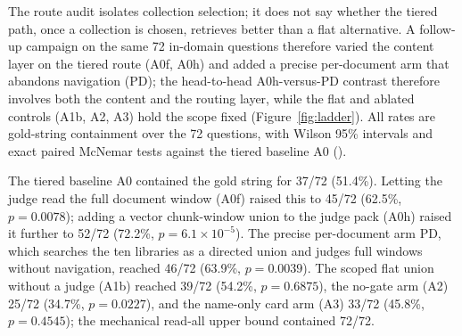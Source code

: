 The route audit isolates collection selection; it does not say whether the
tiered path, once a collection is chosen, retrieves better than a flat
alternative. A follow-up campaign on the same 72 in-domain questions therefore
varied the content layer on the tiered route (A0f, A0h) and added a precise
per-document arm that abandons navigation (PD); the head-to-head
A0h-versus-PD contrast therefore involves both the content and the routing
layer, while the flat and ablated controls (A1b, A2, A3) hold the scope fixed
(Figure~\ref{fig:ladder}). All rates
are gold-string containment over the 72 questions, with Wilson 95\% intervals
and exact paired McNemar tests against the tiered baseline A0
().

The tiered baseline A0 contained the gold string for 37/72 (51.4\%). Letting
the judge read the full document window (A0f) raised this to 45/72 (62.5\%,
$p=0.0078$); adding a vector chunk-window union to the judge pack (A0h)
raised it further to 52/72 (72.2\%, $p=6.1\times10^{-5}$). The precise
per-document arm PD, which searches the ten libraries as a directed union and
judges full windows without navigation, reached 46/72 (63.9\%,
$p=0.0039$). The scoped flat union without a judge (A1b) reached 39/72
(54.2\%, $p=0.6875$), the no-gate arm (A2) 25/72 (34.7\%, $p=0.0227$), and the
name-only card arm (A3) 33/72 (45.8\%, $p=0.4545$); the mechanical read-all
upper bound contained 72/72.

